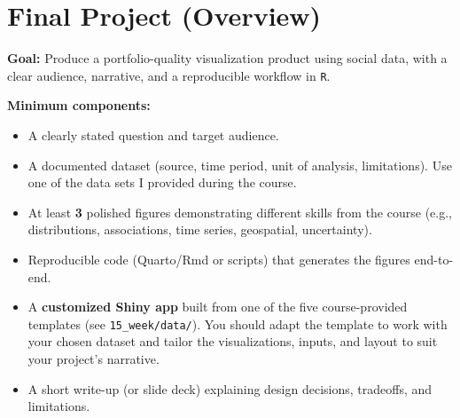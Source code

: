 \documentclass[letterpaper,11pt]{article}
\newcommand{\R}{\texttt{R}}
\newcommand{\compresslist}{
\setlength{\itemsep}{1pt}
\setlength{\parskip}{0pt}
\setlength{\parsep}{0pt}
}
\begin{document}
\section*{Final Project (Overview)}
\textbf{Goal:} Produce a portfolio-quality visualization product using social data, with a clear audience, narrative, and a reproducible workflow in \R{}.

\medskip
\noindent \textbf{Minimum components:}
\begin{itemize}\compresslist
\item A clearly stated question and target audience.
\item A documented dataset (source, time period, unit of analysis, limitations). Use one of the data sets I provided during the course. 
\item At least \textbf{3} polished figures demonstrating different skills from the course (e.g., distributions, associations, time series, geospatial, uncertainty).
\item Reproducible code (Quarto/Rmd or scripts) that generates the figures end-to-end.
\item A \textbf{customized Shiny app} built from one of the five course-provided templates (see \texttt{15\_week/data/}). You should adapt the template to work with your chosen dataset and tailor the visualizations, inputs, and layout to suit your project's narrative.
\item A short write-up (or slide deck) explaining design decisions, tradeoffs, and limitations.
\end{itemize}
\end{document}
